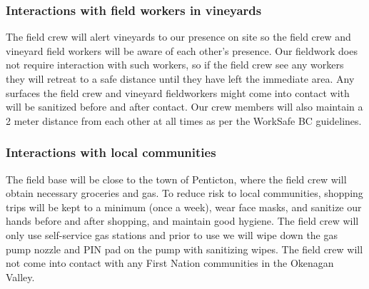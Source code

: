 \documentclass[11pt,letter]{article}
\begin{document}
\subsubsection{Interactions with field workers in vineyards}
The field crew will alert vineyards to our presence on site so the field crew and vineyard field workers will be aware of each other's presence. Our fieldwork does not require interaction with such workers, so if the field crew see any workers they will retreat to a safe distance until they have left the immediate area. Any surfaces the field crew and vineyard fieldworkers might come into contact with will be sanitized before and after contact. Our crew members will also maintain a 2 meter distance from each other at all times as per the WorkSafe BC guidelines.   

\subsubsection{Interactions with local communities}
The field base will be close to the town of Penticton, where the field crew will obtain necessary groceries and gas. To reduce risk to local communities, shopping trips will be kept to a minimum (once a week), wear face masks, and sanitize our hands before and after shopping, and maintain good hygiene. The field crew will only use self-service gas stations and prior to use we will wipe down the gas pump nozzle and PIN pad on the pump with sanitizing wipes. The field crew will not come into contact with any First Nation communities in the Okenagan Valley. 
\end{document}

